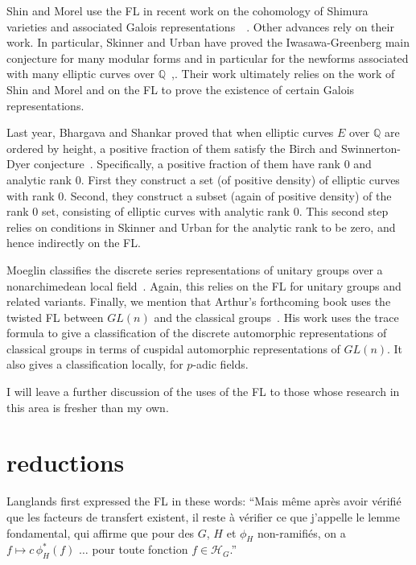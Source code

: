 \documentclass[brochure,english,12pt]{bourbaki}
\theoremstyle{plain}
\newcommand{\ring}[1]{\mathbb{#1}}
\begin{document}


Shin and Morel use the FL in recent work on the cohomology of Shimura
varieties and associated Galois
representations~\cite{Shin:2010}~\cite{Morel:2010}.  Other advances
rely on their work.  In particular,
Skinner and Urban have proved the Iwasawa-Greenberg main conjecture
for many modular forms and in particular for the newforms associated
with many elliptic curves over
$\ring{Q}$~\cite{Skinner-Urban:2010},\cite{Skinner:2010}.  Their work
ultimately relies on the work of Shin and Morel and on the FL to prove
the existence of certain Galois representations. 


Last year, Bhargava and Shankar proved that when elliptic curves $E$
over $\ring{Q}$ are ordered by height, a positive fraction of them
satisfy the Birch and Swinnerton-Dyer conjecture~\cite{BS:2010}.
Specifically, a positive fraction of them have rank $0$ and analytic
rank $0$.  First they construct a set (of positive density) of
elliptic curves with rank $0$.  Second, they construct a subset (again
of positive density) of the rank $0$ set, consisting of elliptic
curves with analytic rank $0$.  This second step relies on conditions
in Skinner and Urban for the analytic rank to be zero, and hence
indirectly on the FL.


Moeglin classifies the discrete series representations of unitary
groups over a nonarchimedean local field~\cite{Moeglin:2007}.  Again,
this relies on the FL for unitary groups and related
variants. Finally, we mention that Arthur's forthcoming book uses the
twisted FL between $GL(n)$ and the classical
groups~\cite{Arthur:2011}.  His work uses the trace formula to give a
classification of the discrete automorphic representations of
classical groups in terms of cuspidal automorphic representations of
$GL(n)$.  It also gives a classification locally, for $p$-adic fields.

I will leave a further discussion of the uses of the FL to those whose research
in this area is fresher than my own.

%




\section{reductions}\label{sec:reduce}

Langlands first expressed the FL in these words:
``Mais m\^eme apr\`es avoir
v\'erifi\'e que les facteurs de
transfert existent, il reste \`a v\'erifier ce que j'appelle le
lemme fondamental, qui affirme que pour des $G$, $H$ et $\phi_H$
non-ramifi\'es, on a $f\mapsto c\, \phi_H^*(f)$ $\ldots$ 
pour toute fonction $f\in {\mathcal H}_G$.''
\cite[p.49]{Langlands:debuts}
\end{document}
